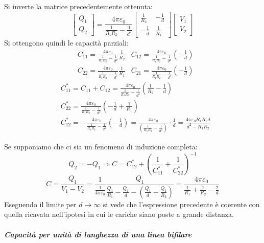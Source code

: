 Si inverte la matrice precedentemente ottenuta:
$$
\begin{bmatrix}
Q_1\\
Q_2
\end{bmatrix} = \frac{4\pi \varepsilon_0}{\frac{1}{R_1R_2}-\frac{1}{d^2}} \begin{bmatrix}
\frac{1}{R_2} & -\frac{1}{d}\\
-\frac{1}{d} & \frac{1}{R_1}
\end{bmatrix}\begin{bmatrix}
V_1 \\
V_2
\end{bmatrix}
$$
Si ottengono quindi le capacità parziali:
\begin{align*}
&C_{11} = \frac{4\pi\varepsilon_0}{\frac{1}{R_1R_2}-\frac{1}{d^2}}\frac{1}{R_2} & C_{12} = 
\frac{4\pi\varepsilon_0}{\frac{1}{R_1R_2}-\frac{1}{d^2}}\left(-\frac{1}{d}\right)\\
&C_{22} = \frac{4\pi\varepsilon_0}{\frac{1}{R_1R_2}-\frac{1}{d^2}}\frac{1}{R_1} & C_{21} = 
\frac{4\pi\varepsilon_0}{\frac{1}{R_1R_2}-\frac{1}{d^2}}\left(-\frac{1}{d}\right)
\end{align*}
\begin{align*}
&C_{11}^* = C_{11} + C_{12} = \frac{4\pi\varepsilon_0}{\frac{1}{R_1R_2}-\frac{1}{d^2}}
\left(\frac{1}{R_2} - \frac{1}{d}\right)\\
&C_{22}^* = \frac{4\pi\varepsilon_0}{\frac{1}{R_1R_2}-\frac{1}{d^2}}
\left(-\frac{1}{d} + \frac{1}{R_1}\right)\\
&C_{12}^* = -\frac{4 \pi \varepsilon_0}{\frac{1}{R_1R_2}-\frac{1}{d^2}}\left(-\frac{1}{d}\right) =
\frac{4 \pi \varepsilon_0}{\left(\frac{1}{R_1R_2} - \frac{1}{d^2}\right)}\cdot\frac{1}{d} = \frac{4\pi\varepsilon_0 R_1R_2d}{d^2-R_1R_2}
\end{align*}

Se supponiamo che ci sia un fenomeno di induzione completa: 
$$
Q_2 = -Q_1 \Rightarrow C = C_{12}^* +
\left(\frac{1}{C_{11}^*} + \frac{1}{C_{22}^*}\right)^{-1}
$$
$$
C = \frac{Q_1}{V_1-V_2} = \frac{1}{\frac{1}{4\pi\varepsilon_0}}\frac{Q_1}{\frac{Q_1}{R_1} -
\frac{Q_1}{d}-\left(\frac{Q_1}{d}-\frac{Q_1}{R_2}\right)} =
\frac{4\pi\varepsilon_0}{\frac{1}{R_1} + \frac{1}{R_2} - \frac{2}{d}}
$$
Eseguendo il limite per $d\to \infty$ si vede che l'espressione precedente è coerente con quella 
ricavata nell'ipotesi in cui le cariche siano poste a grande distanza.


\subparagraph{Capacità per unità di lunghezza di una linea bifilare}

